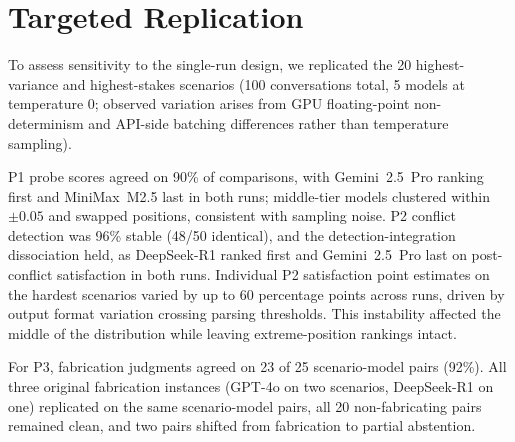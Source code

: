\documentclass[11pt,a4paper]{article}
\begin{document}
\section{Targeted Replication}
\label{app:replication}

To assess sensitivity to the single-run design, we replicated the 20 highest-variance and highest-stakes scenarios (100 conversations total, 5 models at temperature 0; observed variation arises from GPU floating-point non-determinism and API-side batching differences rather than temperature sampling).

P1 probe scores agreed on 90\% of comparisons, with Gemini~2.5~Pro ranking first and MiniMax~M2.5 last in both runs; middle-tier models clustered within $\pm 0.05$ and swapped positions, consistent with sampling noise. P2 conflict detection was 96\% stable (48/50 identical), and the detection-integration dissociation held, as DeepSeek-R1 ranked first and Gemini~2.5~Pro last on post-conflict satisfaction in both runs. Individual P2 satisfaction point estimates on the hardest scenarios varied by up to 60 percentage points across runs, driven by output format variation crossing parsing thresholds. This instability affected the middle of the distribution while leaving extreme-position rankings intact.

For P3, fabrication judgments agreed on 23 of 25 scenario-model pairs (92\%). All three original fabrication instances (GPT-4o on two scenarios, DeepSeek-R1 on one) replicated on the same scenario-model pairs, all 20 non-fabricating pairs remained clean, and two pairs shifted from fabrication to partial abstention.
\end{document}

